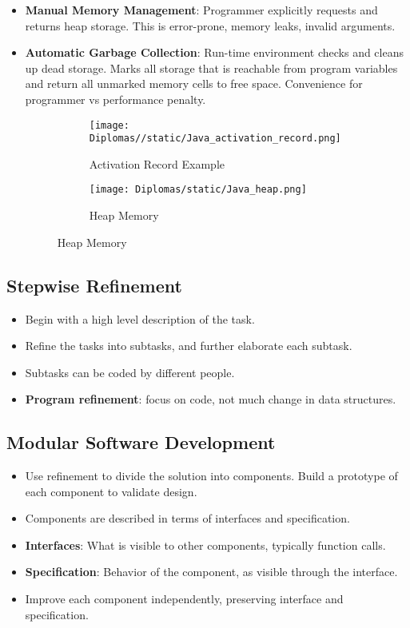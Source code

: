 \documentclass[a4paper]{article}
\begin{document}
\begin{itemize}
    \item \textbf{Manual Memory Management}: Programmer explicitly requests and returns heap storage. This is error-prone, memory leaks, invalid arguments.
    \item \textbf{Automatic Garbage Collection}: Run-time environment checks and cleans up dead storage. Marks all storage that is reachable from program variables and return all unmarked memory cells to free space. Convenience for programmer vs performance penalty.
    \begin{figure}[H]
        \centering
        \begin{subfigure}[b]{0.45\textwidth}
            \centering
            \texttt{[image: Diplomas//static/Java\_activation\_record.png]}
            \caption{Activation Record Example}
            \label{fig:java-activation-record}
        \end{subfigure}
        \hfill
        \begin{subfigure}[b]{0.45\textwidth}
            \centering
            \texttt{[image: Diplomas/static/Java\_heap.png]}
            \caption{Heap Memory}
            \label{fig:java-heap-memory}
        \end{subfigure}
    \end{figure}
\end{itemize}

\subsection{Stepwise Refinement}
\begin{itemize}
    \item Begin with a high level description of the task.
    \item Refine the tasks into subtasks, and further elaborate each subtask.
    \item Subtasks can be coded by different people.
    \item \textbf{Program refinement}: focus on code, not much change in data structures.
\end{itemize}

\subsection{Modular Software Development}
\begin{itemize}
    \item Use refinement to divide the solution into components. Build a prototype of each component to validate design.
    \item Components are described in terms of interfaces and specification.
    \item \textbf{Interfaces}: What is visible to other components, typically function calls.
    \item \textbf{Specification}: Behavior of the component, as visible through the interface.
    \item Improve each component independently, preserving interface and specification.
\end{itemize}
\end{document}
